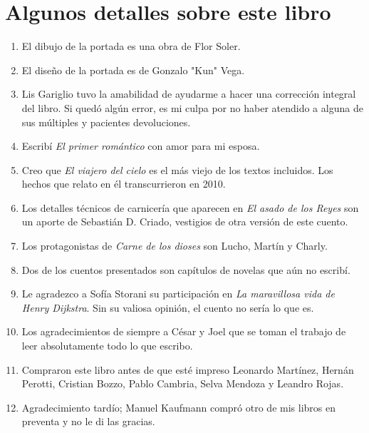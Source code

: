 \documentclass[11pt,twoside,openright]{book}
\begin{document}




























\cleardoublepage

{\small
\section*{Algunos detalles sobre este libro}

\begin{enumerate}
\item El dibujo de la portada es una obra de Flor Soler.
\item El diseño de la portada es de Gonzalo "Kun" Vega.
\item Lis Gariglio tuvo la amabilidad de ayudarme a hacer una corrección integral del libro. Si quedó algún error, es mi culpa por no haber atendido a alguna de sus múltiples y pacientes devoluciones.
\item Escribí \emph{El primer romántico} con amor para mi esposa.
\item Creo que \emph{El viajero del cielo} es el más viejo de los textos incluidos. Los hechos que  relato en él transcurrieron en 2010.
\item Los detalles técnicos de carnicería que aparecen en \emph{El asado de los Reyes} son un aporte de Sebastián D. Criado, vestigios de otra versión de este cuento.
\item Los protagonistas de \emph{Carne de los dioses} son Lucho, Martín y Charly.
\item Dos de los cuentos presentados son capítulos de novelas que aún no escribí.
\item Le agradezco a Sofía Storani su participación en \emph{La maravillosa vida de Henry Dijkstra}. Sin su valiosa opinión, el cuento no sería lo que es.
\item Los agradecimientos de siempre a César y Joel que se toman el trabajo de leer absolutamente todo lo que escribo.
\item Compraron este libro antes de que esté impreso Leonardo Martínez, Hernán Perotti, Cristian Bozzo, Pablo Cambria, Selva Mendoza y Leandro Rojas.
\item Agradecimiento tardío; Manuel Kaufmann compró otro de mis libros en preventa y no le di las gracias.
\end{enumerate}
}
\end{document}
